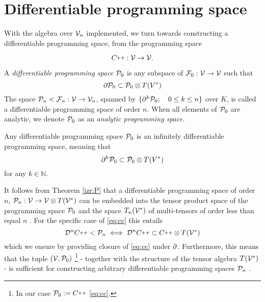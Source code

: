 \section{Differentiable programming space}\label{sec:differentiableProgSpace}

With the algebra over $\mathcal{V}_n$ implemented, we turn towards constructing a differentiable programming space, from the programming space
              
\begin{equation}\label{eq:cc}
\CC:\VV\to\VV.
\end{equation}

\begin{definition}\label{def:dP}
  A \emph{differentiable programming space} $\mathcal{P}_0$ is any subspace of $\mathcal{F}_0:\mathcal{V}\to\mathcal{V}$ such that
  \begin{equation}\label{eq:P}
  \partial\mathcal{P}_0\subset\mathcal{P}_0\otimes T(V^*)
  \end{equation}
  The space $\mathcal{P}_n<\mathcal{F}_n:\mathcal{V}\to\mathcal{V}_n$, spanned by $\{\partial^k\mathcal{P}_0;\quad 0\le k\le n\}$ over $K$, is called a differentiable programming space of order $n$. When all elements of $\mathcal{P}_0$ are analytic, we denote $\mathcal{P}_0$ as an \emph{analytic programming space}. \cite[Definition~4.2]{OperationalCalculus}
 \end{definition}
              
\begin{theorem}\label{izr:P}
  Any differentiable programming space $\mathcal{P}_0$ is an
  infinitely differentiable programming space, meaning that
  \begin{equation}\label{eq:P_n}
      \partial^k\mathcal{P}_0\subset\mathcal{P}_0\otimes T(V^*)
    \end{equation}
for any $k\in\mathbb{N}$. \cite[Theorem~4.1]{OperationalCalculus}
\end{theorem}

It follows from Theorem \ref{izr:P} that a differentiable programming space of order $n$, $\mathcal{P}_n:\mathcal{V}\to\mathcal{V}\otimes T(\mathcal{V}^*)$ can be embedded into the tensor product space of the programming space $\mathcal{P}_0$ and the space $T_n(\mathcal{V}^*)$ of multi-tensors of order less than equal $n$ \cite[Corollary~4.1.1]{OperationalCalculus}. For the specific case of \eqref{eq:cc} this entails
\begin{equation}
\DD^n\CC<\dP_n\iff\DD^n\CC\subset\CC\otimes T(\VV^*)
\end{equation}
which we ensure by providing closure of \eqref{eq:cc} under $\partial$. Furthermore, this means that the tuple $(\mathcal{V},\mathcal{P}_0)$
\footnote{In our case $\dP_0:=\CC$ \eqref{eq:cc}.}
 - together with the structure of the tensor algebra $T(\mathcal{V}^*)$ - is sufficient for constructing arbitrary differentiable programming spaces $\mathcal{P}_n$ .
              
